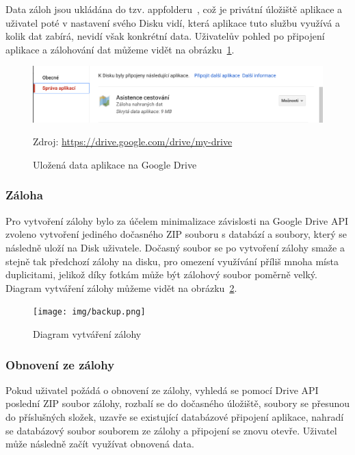 \documentclass[czech,master,public,dept460,male,java,cpdeclaration]{diploma}
\begin{document}
 Data záloh jsou ukládána do tzv. appfolderu~\cite{driveappfolder}, což je privátní úložiště aplikace
 a uživatel poté v nastavení svého Disku vidí,
 která aplikace tuto službu využívá a kolik dat zabírá, nevidí však konkrétní data.
 Uživatelův pohled po připojení aplikace a zálohování dat můžeme vidět na obrázku~\ref{fig:connecteddrive}.

\begin{figure}[H]
        \centering
                \includegraphics[scale=0.3]{img/connectedDrive.png}
        \caption{Uložená data aplikace na Google Drive}
        \label{fig:connecteddrive}
        \centering Zdroj: \url{https://drive.google.com/drive/my-drive}
\end{figure}

\subsubsection{Záloha}
Pro vytvoření zálohy bylo za účelem minimalizace závislosti na Google Drive API zvoleno vytvoření jediného
dočasného ZIP souboru s databází a soubory, který se následně uloží na Disk uživatele. Dočasný soubor se po
vytvoření zálohy smaže a stejně tak předchozí zálohy na disku, pro omezení využívání příliš mnoha místa duplicitami,
jelikož díky fotkám může být zálohový soubor poměrně velký. Diagram vytváření zálohy můžeme vidět na obrázku~\ref{fig:backup}.

\begin{figure}[H]
        \centering
                \texttt{[image: img/backup.png]}
        \caption{Diagram vytváření zálohy}
        \label{fig:backup}
\end{figure}

\subsubsection{Obnovení ze zálohy}
Pokud uživatel požádá o obnovení ze zálohy, vyhledá se pomocí Drive API poslední ZIP soubor zálohy,
rozbalí se do dočasného úložiště, soubory se přesunou do příslušných složek, uzavře se existující
databázové připojení aplikace, nahradí se databázový soubor souborem ze zálohy a připojení se znovu otevře.
Uživatel může následně začít využívat obnovená data.
\end{document}
